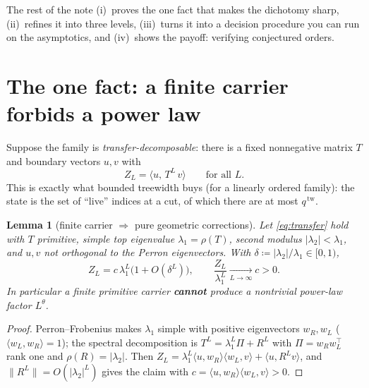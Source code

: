 \documentclass[11pt]{article}
\newcommand{\tw}{\operatorname{tw}}
\newcommand{\eqdef}{\coloneqq}
\newcommand{\spec}{\rho}
\theoremstyle{plain}
\newtheorem{lemma}{Lemma}
\theoremstyle{definition}
\begin{document}
\begin{center}
\end{center}

The rest of the note (i)~proves the one fact that makes the dichotomy sharp,
(ii)~refines it into three levels, (iii)~turns it into a decision procedure you
can run on the asymptotics, and (iv)~shows the payoff: verifying conjectured
orders.

\section{The one fact: a finite carrier forbids a power law}

Suppose the family is \emph{transfer-decomposable}: there is a fixed nonnegative
matrix $T$ and boundary vectors $u,v$ with
\begin{equation}
\label{eq:transfer}
   Z_L=\langle u,\,T^{L}\,v\rangle\qquad\text{for all }L.
\end{equation}
This is exactly what bounded treewidth buys (for a linearly ordered family): the
state is the set of ``live'' indices at a cut, of which there are at most
$q^{\,\tw}$.

\begin{lemma}[finite carrier $\Rightarrow$ pure geometric corrections]
\label{lem:main}
Let \eqref{eq:transfer} hold with $T$ primitive, simple top eigenvalue
$\lambda_1=\spec(T)$, second modulus $|\lambda_2|<\lambda_1$, and $u,v$ not
orthogonal to the Perron eigenvectors. With $\delta\eqdef|\lambda_2|/\lambda_1\in[0,1)$,
\[
   \boxed{\;Z_L=c\,\lambda_1^{L}\bigl(1+O(\delta^{L})\bigr),\qquad
   \frac{Z_L}{\lambda_1^{L}}\xrightarrow[L\to\infty]{}c>0.\;}
\]
In particular a finite primitive carrier \textbf{cannot} produce a nontrivial
power-law factor $L^{\theta}$.
\end{lemma}

\begin{proof}
Perron--Frobenius makes $\lambda_1$ simple with positive eigenvectors $w_R,w_L$
($\langle w_L,w_R\rangle=1$); the spectral decomposition is
$T^{L}=\lambda_1^{L}\Pi+R^{L}$ with $\Pi=w_Rw_L^{\!\top}$ rank one and
$\spec(R)=|\lambda_2|$. Then
$Z_L=\lambda_1^{L}\langle u,w_R\rangle\langle w_L,v\rangle+\langle u,R^{L}v\rangle$,
and $\|R^{L}\|=O(|\lambda_2|^{L})$ gives the claim with
$c=\langle u,w_R\rangle\langle w_L,v\rangle>0$.
\end{proof}
\end{document}
